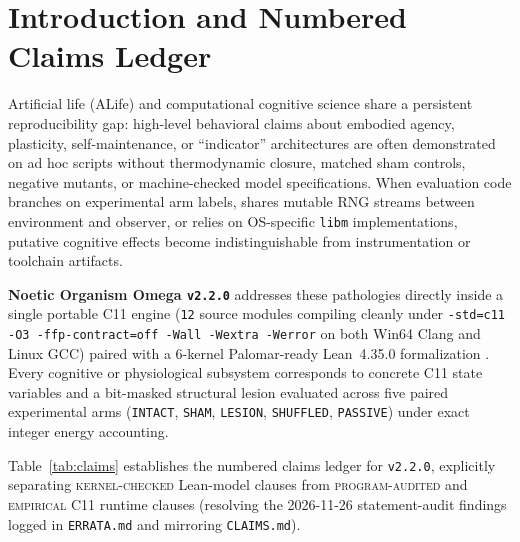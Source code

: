 \documentclass[11pt,reqno]{amsart}
\theoremstyle{remark}
\newcommand{\tagKC}{\textsc{kernel-checked}}
\newcommand{\tagPA}{\textsc{program-audited}}
\newcommand{\tagEM}{\textsc{empirical}}
\newcommand{\tagIO}{\textsc{indicator-only}}
\begin{document}
\begin{abstract}
\textbf{Epistemic Scope and Non-Peer-Reviewed Notice.} This preprint is an independent, AI-assisted technical research artifact and has \emph{not} undergone formal peer review. All 14 Butlin indicators, all 10 consciousness-framework checks, and 5 mirrored CQM items are strictly \tagIO{} computational/architectural proxies; this work makes \emph{zero} claims of subjective qualia, phenomenal consciousness, sentience, or moral patienthood, and retires \textbf{0 / 1,900} overarching problems in the Unsolved Problems Mega-Atlas.
\end{abstract}

\maketitle

\section{Introduction and Numbered Claims Ledger}
\label{sec:intro}

Artificial life (ALife) and computational cognitive science share a persistent reproducibility gap: high-level behavioral claims about embodied agency, plasticity, self-maintenance, or ``indicator'' architectures \cite{bedau2000,butlin2023} are often demonstrated on ad hoc scripts without thermodynamic closure, matched sham controls, negative mutants, or machine-checked model specifications. When evaluation code branches on experimental arm labels, shares mutable RNG streams between environment and observer, or relies on OS-specific \texttt{libm} implementations, putative cognitive effects become indistinguishable from instrumentation or toolchain artifacts.

\textbf{Noetic Organism Omega \texttt{v2.2.0}} addresses these pathologies directly inside a single portable C11 engine (\texttt{12} source modules compiling cleanly under \texttt{-std=c11 -O3 -ffp-contract=off -Wall -Wextra -Werror} on both Win64 Clang and Linux GCC) paired with a 6-kernel Palomar-ready Lean~4.35.0 formalization \cite{moura2021,carneiro2024}. Every cognitive or physiological subsystem corresponds to concrete C11 state variables and a bit-masked structural lesion evaluated across five paired experimental arms (\texttt{INTACT}, \texttt{SHAM}, \texttt{LESION}, \texttt{SHUFFLED}, \texttt{PASSIVE}) under exact integer energy accounting.

Table~\ref{tab:claims} establishes the numbered claims ledger for \texttt{v2.2.0}, explicitly separating \tagKC{} Lean-model clauses from \tagPA{} and \tagEM{} C11 runtime clauses (resolving the 2026-11-26 statement-audit findings logged in \texttt{ERRATA.md} and mirroring \texttt{CLAIMS.md}).
\end{document}

